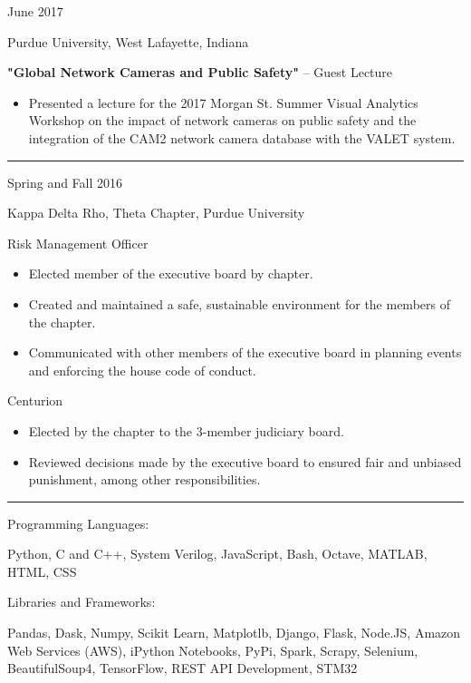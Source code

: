 \documentclass[10pt]{article}
\newlength{\cvcolumngapwidth}
\newlength{\cvleftcolumnwidth}
\newlength{\cvrightcolumnwidth}
\newcommand{\cvsectionstyle}[1]{{\normalsize\cvsectionfont\textcolor{cvsectioncolor}{#1}}}
\newcommand{\cvtitlestyle}[1]{{\large\cvtitlefont\textcolor{cvtitlecolor}{#1}}}
\newcommand{\cvdurationstyle}[1]{{\small\cvdurationfont\textcolor{cvdurationcolor}{#1}}}
\newcommand{\cvheadingstyle}[1]{{\normalsize\cvheadingfont\textcolor{cvheadingcolor}{#1}}}
\newlength{\cvafteritemskipamount}
\newlength{\cvaftersectionskipamount}
\newlength{\cvbetweensectionandheadingextraskipamount}
\newlength{\cvparskip}
\newcommand{\cvsection}[1]{
    \begin{minipage}[t]{\cvleftcolumnwidth}
        \raggedleft\cvsectionstyle{#1}
    \end{minipage}%
    \hspace{\cvcolumngapwidth}%
    \begin{minipage}[t]{\cvrightcolumnwidth}
        \textcolor{cvrulecolor}{\rule{\cvrightcolumnwidth}{0.3mm}}
    \end{minipage}

    \vspace{\cvaftersectionskipamount}
}
\newcommand{\cvitem}[2]{
    \begin{minipage}[t]{\cvleftcolumnwidth}
        \raggedleft #1
    \end{minipage}%
    \hspace{\cvcolumngapwidth}%
    \begin{minipage}[t]{\cvrightcolumnwidth}
        \setlength{\parskip}{\cvparskip} #2
    \end{minipage}

    \vspace{\cvafteritemskipamount}
}
\newcommand{\cvtitle}[1]{
    \cvtitlestyle{#1}

    \vspace{1mm plus 0.25mm minus 0.25mm}
    \vspace{-\cvparskip}
}
\begin{document}
\cvitem{
    \cvdurationstyle{June 2017}
}{
    \cvtitle{Purdue University, West Lafayette, Indiana}
    
  \textbf{"Global Network Cameras and Public Safety"} – Guest Lecture

    \begin{itemize}[leftmargin=*]
        \item Presented a lecture for the 2017 Morgan St. Summer Visual Analytics Workshop on the impact of network cameras on public safety and the integration of the CAM2 network camera database with the VALET system.
    \end{itemize}
}

\cvsection{FRATERNITY LEADERSHIP}

\cvitem{
    \cvdurationstyle{Spring and Fall 2016}
}{
    \cvtitle{Kappa Delta Rho, Theta Chapter, Purdue University}
    
    Risk Management Officer

    \begin{itemize}[leftmargin=*]
        \item Elected member of the executive board by chapter.
        \item Created and maintained a safe, sustainable environment for the members of the chapter.
        \item Communicated with other members of the executive board in planning events and enforcing the house code of conduct. 
    \end{itemize}
    
    Centurion

    \begin{itemize}[leftmargin=*]
        \item Elected by the chapter to the 3-member judiciary board.
        \item Reviewed decisions made by the executive board to ensured fair and unbiased punishment, among other responsibilities.
    \end{itemize}
}


\cvsection{SKILLS}

\vspace{\cvbetweensectionandheadingextraskipamount}
\cvitem{
    \cvheadingstyle{Programming Languages:}
}{
    Python, C and C++, System Verilog, JavaScript, Bash, Octave, MATLAB, HTML, CSS
}
\cvitem{
    \cvheadingstyle{Libraries and Frameworks:}
}{
    Pandas, Dask, Numpy, Scikit Learn, Matplotlb, Django, Flask, Node.JS, Amazon Web Services (AWS), iPython Notebooks, PyPi, Spark, Scrapy, Selenium, BeautifulSoup4, TensorFlow, REST API Development, STM32
}
\end{document}
